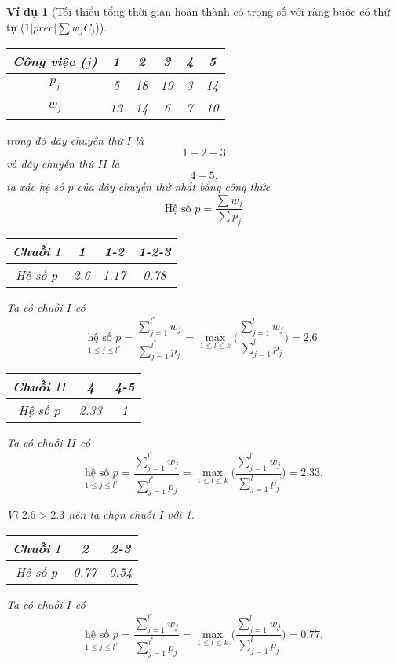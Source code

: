 \documentclass[12pt,a4paper]{report}
\newtheorem{vd}{Ví dụ}
\begin{document}
\begin{vd}[Tối thiểu tổng thời gian hoàn thành có trọng số với ràng buộc có thứ tự ($1 | prec | \sum w_j C_j$)]
\begin{table}[h!]
	\centering
	\begin{tabular}{|c | c c c | c c |} 
	\hline
	Công việc ($j$) & 1 & 2 & 3 & 4 & 5 \\
	\hline\hline
	$p_j$ & 5 & 18 & 19 & 3 & 14 \\
	$w_j$ & 13 & 14 & 6 & 7 & 10 \\
	\hline
	\end{tabular}
\end{table}
trong đó dây chuyền thứ $I$ là $$1-2-3$$ và dây chuyền thứ $II$ là $$4-5.$$
ta xác hệ số $p$ của dây chuyền thứ nhất bằng công thức $$\text{Hệ số }p=\frac{\sum w_j}{\sum p_j}$$

\begin{table}[h!]
	\centering
	\begin{tabular}{|c | c c c |} 
	\hline
	Chuỗi $I$ & 1 & 1-2 & 1-2-3 \\
	\hline\hline
	Hệ số $p$ & 2.6 & 1.17 & 0.78 \\
	\hline
	\end{tabular}
\end{table}
Ta có chuỗi $I$ có $$
	\underset{1 \leq j \leq l^*}{\text{hệ số }p}= \frac{\sum_{j=1}^{l^*}w_j}{\sum_{j=1}^{l^*}p_j} = \underset{1 \leq l \leq k}{\max}\Biggl(\frac{\sum_{j=1}^{l}w_j}{\sum_{j=1}^{l}p_j}\Biggl)=2.6.$$

\begin{table}[h!]
	\centering
	\begin{tabular}{|c | c c |} 
	\hline
	Chuỗi $II$ & 4 & 4-5 \\
	\hline\hline
	Hệ số $p$ & 2.33 & 1 \\
	\hline
	\end{tabular}
\end{table}
Ta có chuỗi $II$ có $$
	\underset{1 \leq j \leq l^*}{\text{hệ số }p}= \frac{\sum_{j=1}^{l^*}w_j}{\sum_{j=1}^{l^*}p_j} = \underset{1 \leq l \leq k}{\max}\Biggl(\frac{\sum_{j=1}^{l}w_j}{\sum_{j=1}^{l}p_j}\Biggl)=2.33.$$

Vì $2.6>2.3$ nên ta chọn chuỗi $I$ với 1.

\begin{table}[h!]
	\centering
	\begin{tabular}{|c | c c |} 
	\hline
	Chuỗi $I$ & 2 & 2-3 \\
	\hline\hline
	Hệ số $p$ & 0.77 & 0.54 \\
	\hline
	\end{tabular}
\end{table}
Ta có chuỗi $I$ có $$
	\underset{1 \leq j \leq l^*}{\text{hệ số }p}= \frac{\sum_{j=1}^{l^*}w_j}{\sum_{j=1}^{l^*}p_j} = \underset{1 \leq l \leq k}{\max}\Biggl(\frac{\sum_{j=1}^{l}w_j}{\sum_{j=1}^{l}p_j}\Biggl)=0.77.$$


\end{vd}
\end{document}
